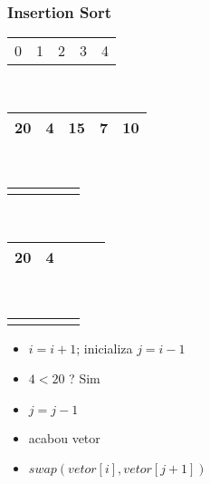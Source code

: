 \documentclass{beamer}
\begin{document}
\begin{frame}
    \frametitle{Insertion Sort}
    \begin{center}
        \begin{table}
            \begin{tabular}{p{0.25cm} p{0.25cm} p{0.25cm} p{0.25cm} p{0.25cm}}
                0 & 1 & 2 & 3 & 4
            \end{tabular} \\
            \begin{tabular}{| p{0.25cm} | p{0.25cm} | p{0.25cm} | p{0.25cm} | p{0.25cm} |}
                \hline
                20 & 4 & 15 & 7 & 10 \\ \hline
            \end{tabular} \\
            \begin{tabular}{p{0.25cm} p{0.25cm} p{0.25cm} p{0.25cm} p{0.25cm}}
                & \color{blue}{$\updownarrow$} & & &
            \end{tabular} \\
            \begin{tabular}{| p{0.25cm} | p{0.25cm} | p{0.25cm} | p{0.25cm} | p{0.25cm} |}
                \hline
                20 & 4 & & & \\ \hline
            \end{tabular} \\
            \begin{tabular}{p{0.25cm} p{0.25cm} p{0.25cm} p{0.25cm} p{0.25cm}}
                \color{red}{$\uparrow$} & \color{blue}{$\uparrow$} & & &
            \end{tabular}
        \end{table}
	\end{center}
    \begin{itemize}[<+->]
        \item $i = i + 1$; inicializa $j = i - 1$
        \item $4 < 20$ ? Sim
        \item $j = j - 1$
        \item acabou vetor
        \item $swap(vetor[i], vetor[j + 1])$
    \end{itemize}
\end{frame}
\end{document}
